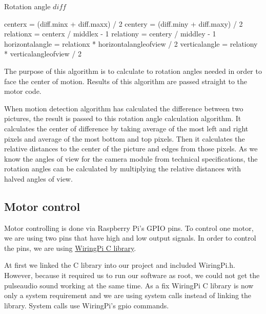 \documentclass[english,11pt,twoside,a4paper]{article}
\begin{document}
\begin{algorithm}
  \label{rotationanglecalc}
  \caption{Rotation angle $diff$}
  \begin{algorithmic}
      \STATE {}
      \STATE centerx = (diff.minx + diff.maxx) / 2
      \STATE centery = (diff.miny + diff.maxy) / 2
        \STATE {}
	\STATE relationx = centerx / middlex - 1
	\STATE relationy = centery / middley - 1
	\STATE {}
	\STATE horizontalangle = relationx * horizontalangleofview / 2
	\STATE verticalangle = relationy * verticalangleofview / 2
      \ENDIF
    \ENDIF
  \end{algorithmic}
\end{algorithm}

The purpose of this algorithm is to calculate to rotation angles needed in order to face the center of motion. Results of this algorithm are passed straight to the motor code.

When motion detection algorithm has calculated the difference between two pictures, the result is passed to this rotation angle calculation algorithm. It calculates the center of difference by taking average of the most left and right pixels and average of the most bottom and top pixels. Then it calculates the relative distances to the center of the picture and edges from those pixels. As we know the angles of view for the camera module from technical specifications, the rotation angles can be calculated by multiplying the relative distances with halved angles of view.

\subsection{Motor control}

Motor controlling is done via Raspberry Pi's GPIO pins. To control one motor, we are using two pins that have high and low output signals. In order to control the pins, we are using \href{http://wiringpi.com/}{WiringPi C library}.

At first we linked the C library into our project and included WiringPi.h. However, because it required us to run our software as root, we could not get the pulseaudio sound working at the same time. As a fix WiringPi C library is now only a system requirement and we are using system calls instead of linking the library. System calls use WiringPi's gpio commands.
\end{document}
